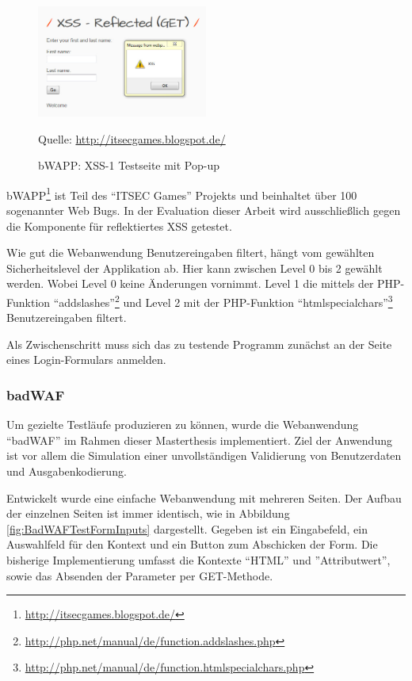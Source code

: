 \begin{figure}[htp] 
	\centering
	\includegraphics[width=0.5\textwidth]{contents/images/bWAPPExampleImage}
	\caption{bWAPP: XSS-1 Testseite mit Pop-up}
	\label{fig:bWAPPExampleImage}
	\source Quelle: \url{http://itsecgames.blogspot.de/} 
\end{figure}

bWAPP\footnote{\url{http://itsecgames.blogspot.de/}} ist Teil des ``ITSEC Games'' Projekts und beinhaltet über 100 sogenannter Web Bugs. In der Evaluation dieser Arbeit wird ausschließlich gegen die Komponente für reflektiertes XSS getestet.

Wie gut die Webanwendung Benutzereingaben filtert, hängt vom gewählten Sicherheitslevel der Applikation ab. Hier kann zwischen Level 0 bis 2 gewählt werden. Wobei Level 0 keine Änderungen vornimmt. Level 1 die mittels der PHP-Funktion ``addslashes''\footnote{\url{http://php.net/manual/de/function.addslashes.php}} und Level 2 mit der PHP-Funktion ``htmlspecialchars''\footnote{\url{http://php.net/manual/de/function.htmlspecialchars.php}} Benutzereingaben filtert.

Als Zwischenschritt muss sich das zu testende Programm zunächst an der Seite eines Login-Formulars anmelden.

\FloatBarrier
\subsubsection{badWAF}

Um gezielte Testläufe produzieren zu können, wurde die Webanwendung ``badWAF'' im Rahmen dieser Masterthesis implementiert. Ziel der Anwendung ist vor allem die Simulation einer unvollständigen Validierung von Benutzerdaten und Ausgabenkodierung.

Entwickelt wurde eine einfache Webanwendung mit mehreren Seiten. Der Aufbau der einzelnen Seiten ist immer identisch, wie in Abbildung \ref{fig:BadWAFTestFormInputs} dargestellt. Gegeben ist ein Eingabefeld, ein Auswahlfeld für den Kontext und ein Button zum Abschicken der Form. Die bisherige Implementierung umfasst die Kontexte ``HTML'' und ''Attributwert'', sowie das Absenden der Parameter per GET-Methode.

